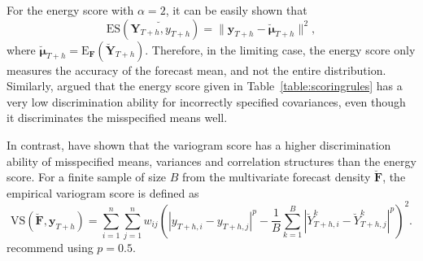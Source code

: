 \documentclass[a4paper, 11pt]{article}
\def\E{\text{E}}
\theoremstyle{theo}
\theoremstyle{definition}
\begin{document}
For the energy score with $\alpha=2$, it can be easily shown that
\begin{equation} \label{eq:(5.1)}
\text{ES}(\breve{\bm{Y}_{T+h},y_{T+h}}) = \|\bm{y}_{T+h}-\breve{\bm{\mu}}_{T+h}\|^2,
\end{equation}
where $\breve{\bm{\mu}}_{T+h} =\E_{\bm{F}}(\breve{\bm{Y}}_{T+h}) $. Therefore, in the limiting case, the energy score only measures the accuracy of the forecast mean, and not the entire distribution. Similarly, \citet{Pinson2013a} argued that the energy score given in Table~\ref{table:scoringrules} has a very low discrimination ability for incorrectly specified covariances, even though it discriminates the misspecified means well.

In contrast, \citet{SCHEUERER2015} have shown that the variogram score has a higher discrimination ability of misspecified means, variances and correlation structures than the energy score. For a finite sample of size $B$ from the multivariate forecast density $\breve{\bm{F}}$, the empirical variogram score is defined as
\begin{equation}
\text{VS}(\breve{\bm{F}}, \bm{y}_{T+h}) = \displaystyle\sum_{i=1}^{n}\displaystyle\sum_{j=1}^{n}w_{ij}\left(|y_{T+h,i} - y_{T+h,j}|^p - \frac{1}{B} \displaystyle\sum_{k=1}^{B} |\breve{Y}^k_{T+h,i}-\breve{Y}^k_{T+h,j}|^p\right)^2.
\end{equation}
\citet{SCHEUERER2015} recommend using $p=0.5$. 



%
\end{document}
